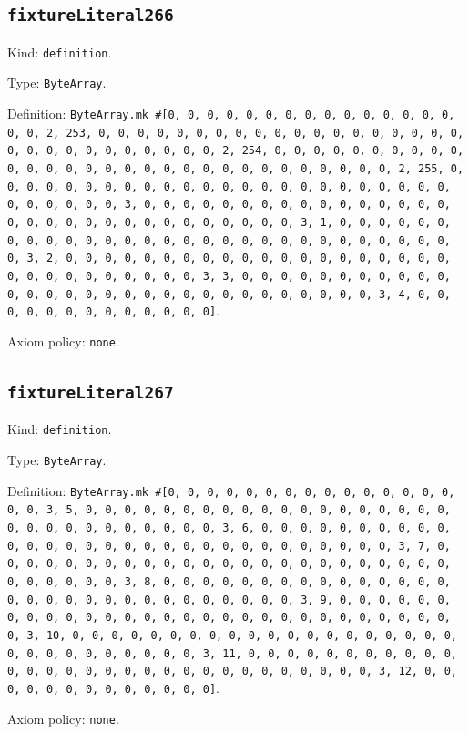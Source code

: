 \documentclass[11pt]{article}
\begin{document}
\subsection*{\texttt{fixtureLiteral266}}
\noindent Kind: \texttt{definition}.\par
\noindent Type: \texttt{ByteArray}.\par
\noindent Definition: \texttt{ByteArray.mk \#[0, 0, 0, 0, 0, 0, 0, 0, 0, 0, 0, 0, 0, 0, 0, 0, 0, 2, 253, 0, 0, 0, 0, 0, 0, 0, 0, 0, 0, 0, 0, 0, 0, 0, 0, 0, 0, 0, 0, 0, 0, 0, 0, 0, 0, 0, 0, 0, 0, 2, 254, 0, 0, 0, 0, 0, 0, 0, 0, 0, 0, 0, 0, 0, 0, 0, 0, 0, 0, 0, 0, 0, 0, 0, 0, 0, 0, 0, 0, 0, 0, 2, 255, 0, 0, 0, 0, 0, 0, 0, 0, 0, 0, 0, 0, 0, 0, 0, 0, 0, 0, 0, 0, 0, 0, 0, 0, 0, 0, 0, 0, 0, 0, 3, 0, 0, 0, 0, 0, 0, 0, 0, 0, 0, 0, 0, 0, 0, 0, 0, 0, 0, 0, 0, 0, 0, 0, 0, 0, 0, 0, 0, 0, 0, 0, 3, 1, 0, 0, 0, 0, 0, 0, 0, 0, 0, 0, 0, 0, 0, 0, 0, 0, 0, 0, 0, 0, 0, 0, 0, 0, 0, 0, 0, 0, 0, 0, 3, 2, 0, 0, 0, 0, 0, 0, 0, 0, 0, 0, 0, 0, 0, 0, 0, 0, 0, 0, 0, 0, 0, 0, 0, 0, 0, 0, 0, 0, 0, 0, 3, 3, 0, 0, 0, 0, 0, 0, 0, 0, 0, 0, 0, 0, 0, 0, 0, 0, 0, 0, 0, 0, 0, 0, 0, 0, 0, 0, 0, 0, 0, 0, 3, 4, 0, 0, 0, 0, 0, 0, 0, 0, 0, 0, 0, 0, 0]}.\par
\noindent Axiom policy: \texttt{none}.\par
\subsection*{\texttt{fixtureLiteral267}}
\noindent Kind: \texttt{definition}.\par
\noindent Type: \texttt{ByteArray}.\par
\noindent Definition: \texttt{ByteArray.mk \#[0, 0, 0, 0, 0, 0, 0, 0, 0, 0, 0, 0, 0, 0, 0, 0, 0, 3, 5, 0, 0, 0, 0, 0, 0, 0, 0, 0, 0, 0, 0, 0, 0, 0, 0, 0, 0, 0, 0, 0, 0, 0, 0, 0, 0, 0, 0, 0, 0, 3, 6, 0, 0, 0, 0, 0, 0, 0, 0, 0, 0, 0, 0, 0, 0, 0, 0, 0, 0, 0, 0, 0, 0, 0, 0, 0, 0, 0, 0, 0, 0, 3, 7, 0, 0, 0, 0, 0, 0, 0, 0, 0, 0, 0, 0, 0, 0, 0, 0, 0, 0, 0, 0, 0, 0, 0, 0, 0, 0, 0, 0, 0, 0, 3, 8, 0, 0, 0, 0, 0, 0, 0, 0, 0, 0, 0, 0, 0, 0, 0, 0, 0, 0, 0, 0, 0, 0, 0, 0, 0, 0, 0, 0, 0, 0, 3, 9, 0, 0, 0, 0, 0, 0, 0, 0, 0, 0, 0, 0, 0, 0, 0, 0, 0, 0, 0, 0, 0, 0, 0, 0, 0, 0, 0, 0, 0, 0, 3, 10, 0, 0, 0, 0, 0, 0, 0, 0, 0, 0, 0, 0, 0, 0, 0, 0, 0, 0, 0, 0, 0, 0, 0, 0, 0, 0, 0, 0, 0, 0, 3, 11, 0, 0, 0, 0, 0, 0, 0, 0, 0, 0, 0, 0, 0, 0, 0, 0, 0, 0, 0, 0, 0, 0, 0, 0, 0, 0, 0, 0, 0, 0, 3, 12, 0, 0, 0, 0, 0, 0, 0, 0, 0, 0, 0, 0, 0]}.\par
\noindent Axiom policy: \texttt{none}.\par
\end{document}
